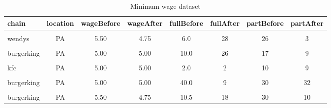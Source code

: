 \documentclass[
]{article}
\begin{document}
\begin{table}[!h]

\caption{\label{tab:table}Minimum wage dataset}
\centering
\fontsize{10}{12}\selectfont
\begin{tabular}[t]{lccccccc}
\toprule
chain & location & wageBefore & wageAfter & fullBefore & fullAfter & partBefore & partAfter\\
\midrule
\cellcolor{gray!6}{wendys} & \cellcolor{gray!6}{PA} & \cellcolor{gray!6}{5.00} & \cellcolor{gray!6}{5.25} & \cellcolor{gray!6}{20.0} & \cellcolor{gray!6}{0} & \cellcolor{gray!6}{20} & \cellcolor{gray!6}{36}\\
wendys & PA & 5.50 & 4.75 & 6.0 & 28 & 26 & 3\\
\cellcolor{gray!6}{burgerking} & \cellcolor{gray!6}{PA} & \cellcolor{gray!6}{5.00} & \cellcolor{gray!6}{4.75} & \cellcolor{gray!6}{50.0} & \cellcolor{gray!6}{15} & \cellcolor{gray!6}{35} & \cellcolor{gray!6}{18}\\
burgerking & PA & 5.00 & 5.00 & 10.0 & 26 & 17 & 9\\
\cellcolor{gray!6}{kfc} & \cellcolor{gray!6}{PA} & \cellcolor{gray!6}{5.25} & \cellcolor{gray!6}{5.00} & \cellcolor{gray!6}{2.0} & \cellcolor{gray!6}{3} & \cellcolor{gray!6}{8} & \cellcolor{gray!6}{12}\\
\addlinespace
kfc & PA & 5.00 & 5.00 & 2.0 & 2 & 10 & 9\\
\cellcolor{gray!6}{roys} & \cellcolor{gray!6}{PA} & \cellcolor{gray!6}{5.00} & \cellcolor{gray!6}{4.75} & \cellcolor{gray!6}{2.5} & \cellcolor{gray!6}{1} & \cellcolor{gray!6}{20} & \cellcolor{gray!6}{25}\\
burgerking & PA & 5.00 & 5.00 & 40.0 & 9 & 30 & 32\\
\cellcolor{gray!6}{burgerking} & \cellcolor{gray!6}{PA} & \cellcolor{gray!6}{5.00} & \cellcolor{gray!6}{4.50} & \cellcolor{gray!6}{8.0} & \cellcolor{gray!6}{7} & \cellcolor{gray!6}{27} & \cellcolor{gray!6}{39}\\
burgerking & PA & 5.50 & 4.75 & 10.5 & 18 & 30 & 10\\
\bottomrule
\end{tabular}
\end{table}

\newpage
\end{document}
